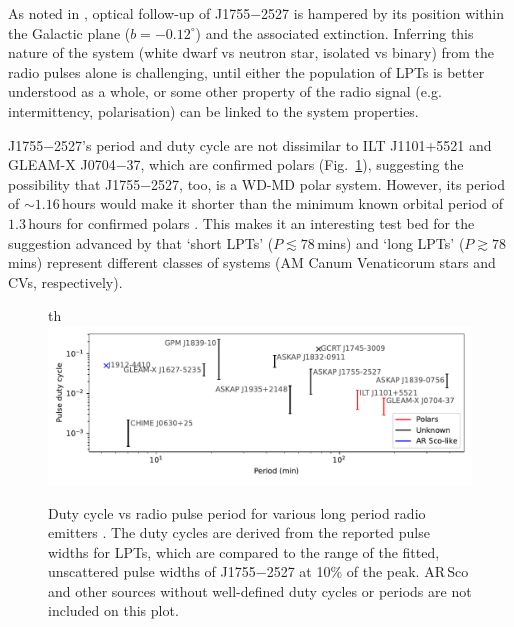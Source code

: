 \documentclass[fleqn,usenatbib]{mnras}
\newcommand{\src}{J1755$-$2527}
\newcommand{\Fig}{Fig.}
\begin{document}
As noted in , optical follow-up of \src{} is hampered by its position within the Galactic plane ($b = -0.12^\circ$) and the associated extinction.
Inferring this nature of the system (white dwarf vs neutron star, isolated vs binary) from the radio pulses alone is challenging, until either the population of LPTs is better understood as a whole, or some other property of the radio signal (e.g. intermittency, polarisation) can be linked to the system properties.

\src{}'s period and duty cycle are not dissimilar to ILT J1101+5521 and GLEAM-X J0704$-$37, which are confirmed polars (\Fig~\ref{fig:lpt_comparison}), suggesting the possibility that \src{}, too, is a WD-MD polar system.
However, its period of ${\sim}1.16\,$hours would make it shorter than the minimum known orbital period of $1.3\,$hours for confirmed polars \citep{schwope2025polarcatcatalogpolarslowaccretion}.
This makes it an interesting test bed for the suggestion advanced by \citet{2025A&A...695L...8R} that `short LPTs' ($P \lesssim 78\,$mins) and `long LPTs' ($P \gtrsim 78\,$mins) represent different classes of systems (AM Canum Venaticorum stars and CVs, respectively).
\begin{figure}{th}
    \centering
    \includegraphics[width=0.98\linewidth]{lpt_comparison.pdf}
    \caption{Duty cycle vs radio pulse period for various long period radio emitters \citep{deRuiter2025,2022Natur.601..526H,2023Natur.619..487H,2024NatAs...8.1159C,2005Natur.434...50H,deRuiter2025,Lee2025,2024arXiv241116606W}. The duty cycles are derived from the reported pulse widths for LPTs, which are compared to the range of the fitted, unscattered pulse widths of \src{} at 10\% of the peak. AR\,Sco \citep{2016Natur.537..374M,2018A&A...611A..66S} and other sources without well-defined duty cycles or periods \citep[e.g.][and references therein]{2021ApJ...920...45W} are not included on this plot.}
    \label{fig:lpt_comparison}
\end{figure}
\end{document}
